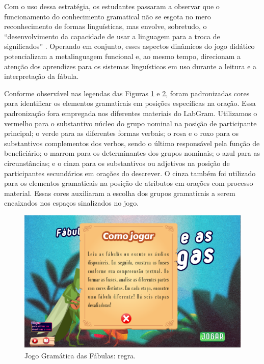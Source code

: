 Com o uso dessa estratégia, os estudantes passaram a observar que o
funcionamento do conhecimento gramatical não se esgota no mero
reconhecimento de formas linguísticas, mas envolve, sobretudo, o
``desenvolvimento da capacidade de usar a linguagem para a troca de
significados'' \cite[p. 399]{hasan_literacy_1996}. Operando em conjunto, esses
aspectos dinâmicos do jogo didático potencializam a metalinguagem
funcional e, ao mesmo tempo, direcionam a atenção dos aprendizes para os
sistemas linguísticos em uso durante a leitura e a interpretação da
fábula.

Conforme observável nas legendas das Figuras \hyperref[fig:fig01]{1} e \hyperref[fig:fig02]{2}, foram padronizadas
cores para identificar os elementos gramaticais em posições específicas
na oração. Essa padronização fora empregada nos diferentes materiais do
LabGram. Utilizamos o vermelho para o substantivo núcleo do grupo
nominal na posição de participante principal; o verde para as diferentes
formas verbais; o rosa e o roxo para os substantivos complementos dos
verbos, sendo o último responsável pela função de beneficiário; o marrom
para os determinantes dos grupos nominais; o azul para as
circunstâncias; e o cinza para os substantivos ou adjetivos na posição
de participantes secundários em orações do descrever. O cinza também foi
utilizado para os elementos gramaticais na posição de atributos em
orações com processo material. Essas cores auxiliaram a escolha dos
grupos gramaticais a serem encaixados nos espaços sinalizados no jogo.

\label{anchor-6}{}

\begin{figure}[h]
\centering
\begin{minipage}{.7\textwidth}
\includegraphics[width=\textwidth]{figure04.png}
\caption{Jogo Gramática das Fábulas: regra.}
\label{fig:fig04}
\end{minipage}
\end{figure}

